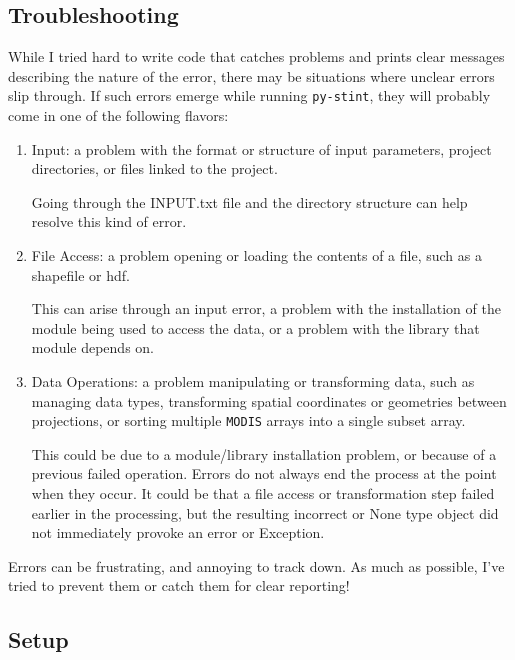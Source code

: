\documentclass[twoside,a4paper]{refart}
\begin{document}
\subsection{Troubleshooting}
While I tried hard to write code that catches problems and prints clear messages describing the nature of the error, there may be situations where unclear errors slip through.  If such errors emerge while running \texttt{py-stint}, they will probably come in one of the following flavors:
\begin{enumerate}
  \item
    Input: a problem with the format or structure of input parameters, 
    project directories, or files linked to the project.  
    
    Going through the INPUT.txt file and the directory structure 
    can help resolve this kind of error.
  \item
    File Access: a problem opening or loading the contents of a file, 
    such as a shapefile or hdf.  
    
    This can arise through an input error, a problem with the 
    installation of the module being used to access the data,
    or a problem with the library that module depends on.
  \item
    Data Operations: a problem manipulating or transforming data, 
    such as managing data types, transforming spatial coordinates or 
    geometries between projections, or sorting multiple 
    \texttt{MODIS} arrays into a single subset array.
    
    This could be due to a module/library installation problem, or 
    because of a previous failed operation. Errors do not always end the process 
    at the point when they occur. It could be that a file access or 
    transformation step failed earlier in the processing, but the 
    resulting incorrect or None type object did not immediately provoke an 
    error or Exception.
    
\end{enumerate}

Errors can be frustrating, and annoying to track down.  As much as possible, I've tried to prevent them or catch them for clear reporting!

\subsection{Setup}
\end{document}
